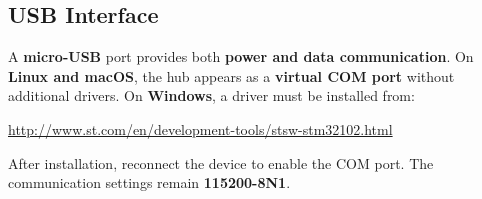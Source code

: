 \subsection{USB Interface}
A \textbf{micro-USB} port provides both \textbf{power and data communication}. On \textbf{Linux and macOS}, the hub appears as a \textbf{virtual COM port} without additional drivers. On \textbf{Windows}, a driver must be installed from:  

\begin{center}
	\url{http://www.st.com/en/development-tools/stsw-stm32102.html}
\end{center}

After installation, reconnect the device to enable the COM port. The communication settings remain \textbf{115200-8N1}.

